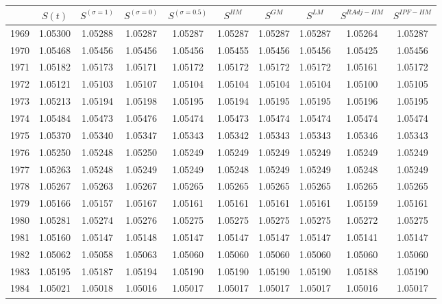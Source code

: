 \begin{tabular}{cccccccccc}
  \hline
 & $S(t)$ & $S^{(\sigma = 1)}$ & $S^{(\sigma = 0)}$ & $S^{(\sigma = 0.5)}$ & $S^{HM}$ & $S^{GM}$ & $S^{LM}$ & $S^{RAdj-HM}$ & $S^{IPF-HM}$ \\ 
  \hline
1969 & 1.05300 & 1.05288 & 1.05287 & 1.05287 & 1.05287 & 1.05287 & 1.05287 & 1.05264 & 1.05287 \\ 
  1970 & 1.05468 & 1.05456 & 1.05456 & 1.05456 & 1.05455 & 1.05456 & 1.05456 & 1.05425 & 1.05456 \\ 
  1971 & 1.05182 & 1.05173 & 1.05171 & 1.05172 & 1.05172 & 1.05172 & 1.05172 & 1.05161 & 1.05172 \\ 
  1972 & 1.05121 & 1.05103 & 1.05107 & 1.05104 & 1.05104 & 1.05104 & 1.05104 & 1.05100 & 1.05105 \\ 
  1973 & 1.05213 & 1.05194 & 1.05198 & 1.05195 & 1.05194 & 1.05195 & 1.05195 & 1.05196 & 1.05195 \\ 
  1974 & 1.05484 & 1.05473 & 1.05476 & 1.05474 & 1.05473 & 1.05474 & 1.05474 & 1.05474 & 1.05474 \\ 
  1975 & 1.05370 & 1.05340 & 1.05347 & 1.05343 & 1.05342 & 1.05343 & 1.05343 & 1.05346 & 1.05343 \\ 
  1976 & 1.05250 & 1.05248 & 1.05250 & 1.05249 & 1.05249 & 1.05249 & 1.05249 & 1.05249 & 1.05249 \\ 
  1977 & 1.05263 & 1.05248 & 1.05249 & 1.05249 & 1.05248 & 1.05249 & 1.05249 & 1.05248 & 1.05249 \\ 
  1978 & 1.05267 & 1.05263 & 1.05267 & 1.05265 & 1.05265 & 1.05265 & 1.05265 & 1.05265 & 1.05265 \\ 
  1979 & 1.05166 & 1.05157 & 1.05167 & 1.05161 & 1.05161 & 1.05161 & 1.05161 & 1.05159 & 1.05161 \\ 
  1980 & 1.05281 & 1.05274 & 1.05276 & 1.05275 & 1.05275 & 1.05275 & 1.05275 & 1.05272 & 1.05275 \\ 
  1981 & 1.05160 & 1.05147 & 1.05148 & 1.05147 & 1.05147 & 1.05147 & 1.05147 & 1.05141 & 1.05147 \\ 
  1982 & 1.05062 & 1.05058 & 1.05063 & 1.05060 & 1.05060 & 1.05060 & 1.05060 & 1.05060 & 1.05060 \\ 
  1983 & 1.05195 & 1.05187 & 1.05194 & 1.05190 & 1.05190 & 1.05190 & 1.05190 & 1.05188 & 1.05190 \\ 
  1984 & 1.05021 & 1.05018 & 1.05016 & 1.05017 & 1.05017 & 1.05017 & 1.05017 & 1.05016 & 1.05017 \\ 

\end{tabular}
